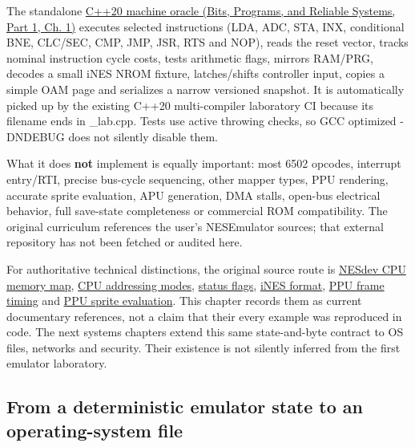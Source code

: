 The standalone \href{../01-Bits-Programs-and-Reliable-Systems-P01/main.pdf\#nameddest=source-file-552a9e2296dc984412c8f06d}{C++20 machine oracle (Bits, Programs, and Reliable Systems, Part 1, Ch. 1)} executes selected instructions (LDA, ADC, STA, INX, conditional BNE, CLC/SEC, CMP, JMP, JSR, RTS and NOP), reads the reset vector, tracks nominal instruction cycle costs, tests arithmetic flags, mirrors RAM/PRG, decodes a small iNES NROM fixture, latches/shifts controller input, copies a simple OAM page and serializes a narrow versioned snapshot. It is automatically picked up by the existing C++20 multi-compiler laboratory CI because its filename ends in \_lab.cpp. Tests use active throwing checks, so GCC optimized -DNDEBUG does not silently disable them.

What it does \textbf{not} implement is equally important: most 6502 opcodes, interrupt entry/RTI, precise bus-cycle sequencing, other mapper types, PPU rendering, accurate sprite evaluation, APU generation, DMA stalls, open-bus electrical behavior, full save-state completeness or commercial ROM compatibility. The original curriculum references the user's NESEmulator sources; that external repository has not been fetched or audited here.

For authoritative technical distinctions, the original source route is \href{https://www.nesdev.org/wiki/CPU_memory_map}{NESdev CPU memory map}, \href{https://www.nesdev.org/wiki/Addressing_modes}{CPU addressing modes}, \href{https://www.nesdev.org/wiki/Status_flag}{status flags}, \href{https://www.nesdev.org/wiki/INES}{iNES format}, \href{https://www.nesdev.org/wiki/PPU_frame_timing}{PPU frame timing} and \href{https://www.nesdev.org/wiki/PPU_sprite_evaluation}{PPU sprite evaluation}. This chapter records them as current documentary references, not a claim that their every example was reproduced in code. The next systems chapters extend this same state-and-byte contract to OS files, networks and security. Their existence is not silently inferred from the first emulator laboratory.

\subsection{From a deterministic emulator state to an operating-system file}\label{06-engine-ii-ch042-from-a-deterministic-emulator-state-to-an-operating-system-file}

\hypertarget{06-engine-ii-ch042-from-a-deterministic-emulator-state-to-an-operating-system-file}{}

